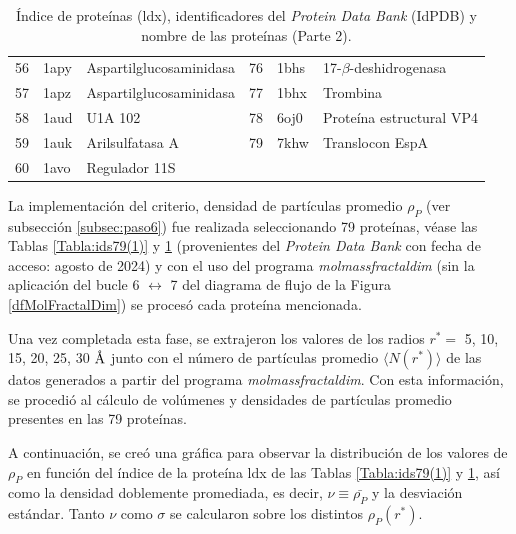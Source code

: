 \begin{table}[H]
\begin{footnotesize}
\begin{tabular}{||l|ll||l|ll||}
 				56  & 1apy  & Aspartilglucosaminidasa              & 76 & 1bhs  & 17-$\beta$-deshidrogenasa        \\
 				57  & 1apz  & Aspartilglucosaminidasa              & 77 & 1bhx  & Trombina                         \\
 				58  & 1aud  & U1A 102                              & 78 & 6oj0  & Prote\'{i}na estructural VP4         \\
 				59  & 1auk  & Arilsulfatasa A                      & 79 & 7khw  & Translocon EspA                  \\
 				60  & 1avo  & Regulador 11S                        &    &       &  \\ \hline
 			\end{tabular}
 		\end{footnotesize}
 		\caption{\'{I}ndice de prote\'{i}nas (ldx), identificadores del \emph{Protein Data Bank} (IdPDB) y nombre de las prote\'{i}nas (Parte 2).}
 		\label{Tabla:ids79(2)}
 	\end{table}
 
 	
 	La implementaci\'{o}n del criterio, densidad de part\'{i}culas 
 	promedio $\rho_{P}$ (ver subsecci\'{o}n \ref{subsec:paso6}) 
 	fue realizada seleccionando 79 prote\'{i}nas, véase las Tablas \ref{Tabla:ids79(1)} y \ref{Tabla:ids79(2)} (provenientes del \textit{Protein Data Bank} con fecha de acceso: agosto de 2024) y con el uso del programa \emph{molmassfractaldim} 
 	(sin la aplicaci\'{o}n del bucle 6 $\longleftrightarrow$ 7 
 	del diagrama de flujo de la Figura \ref{dfMolFractalDim}) 
 	se proces\'{o} cada prote\'{i}na mencionada. 
 
 	Una vez completada esta fase, se extrajeron los valores 
 	de los radios $r^*{=}$ 5, 10, 15, 20, 25, 30 $\textup{\r{A}}$
 	 junto con el n\'{u}mero de part\'{i}culas promedio $\langle N(r^{*}) \rangle$ 
 	  de las datos generados a partir del programa \emph{molmassfractaldim}.
 	   Con esta informaci\'{o}n, se procedi\'{o} al c\'{a}lculo de vol\'{u}menes y densidades 
 	   de part\'{i}culas promedio presentes en las 79 proteínas. 
 	
 	
 	A continuaci\'{o}n, se cre\'{o} una gr\'{a}fica para observar la distribuci\'{o}n 
 	de los valores de $\rho_{P}$ en funci\'{o}n del \'{i}ndice de la 
 	prote\'{i}na ldx de las Tablas \ref{Tabla:ids79(1)} y \ref{Tabla:ids79(2)},
 	 as\'{i} como la densidad doblemente promediada, es decir, $\nu\equiv\bar{\rho_P}$ 
 	 y la desviaci\'{o}n est\'{a}ndar. Tanto $\nu$ como $\sigma$ se calcularon
 	  sobre los distintos $\rho_P(r^*)$.
 	
